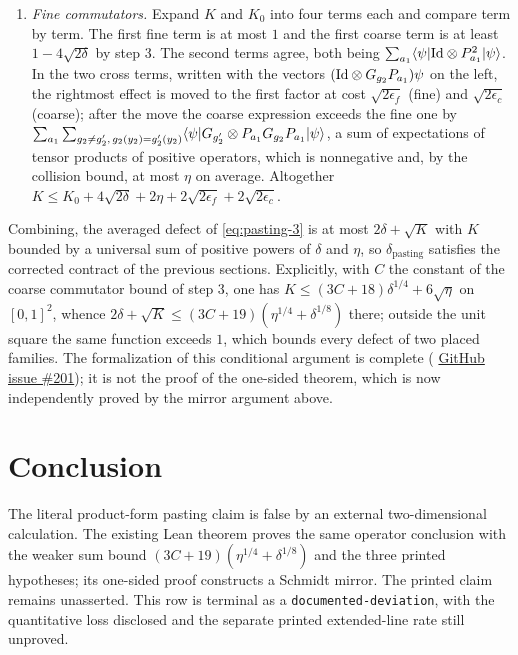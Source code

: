 \documentclass[11pt]{article}
\renewcommand{\ghissue}[1]{%
  \href{https://github.com/Dengnifer/MIPStarRE-QPBT/issues/#1}{GitHub issue \##1}}
\begin{document}
\begin{enumerate}
  $\epsilon_f=\sum_{g_2\neq g_2'}\langle\psi|G_{g_2}\ot G_{g_2'}|\psi\rangle
  \le\epsilon_c+\eta$.  Both families being projective,
  $\sum_{g_2}\|(G_{g_2}\ot\mathrm{Id}-\mathrm{Id}\ot G_{g_2})\psi\|^2
  =2\epsilon_f$, and likewise $2\epsilon_c$ for the coarse family.  This is
  the only step using \eqref{eq:pasting-1-sym}.
  \item \emph{Fine commutators.}  Expand $K$ and $K_0$ into four terms each
  and compare term by term.  The first fine term is at most $1$ and the first
  coarse term is at least $1-4\sqrt{2\delta}$ by step 3.  The second terms
  agree, both being $\sum_{a_1}\langle\psi|\mathrm{Id}\otimes P_{a_1}^2|\psi\rangle$.
  In the two cross terms, written with the vectors
  $(\mathrm{Id}\otimes G_{g_2}P_{a_1})\psi$ on the left, the rightmost effect is
  moved to the first factor at cost $\sqrt{2\epsilon_f}$ (fine) and
  $\sqrt{2\epsilon_c}$ (coarse); after the move the coarse expression exceeds
  the fine one by
  $\sum_{a_1}\sum_{g_2\neq g_2',\,g_2(y_2)=g_2'(y_2)}
  \langle\psi|G_{g_2'}\otimes P_{a_1}G_{g_2}P_{a_1}|\psi\rangle$, a sum of
  expectations of tensor products of positive operators, which is
  nonnegative and, by the collision bound, at most $\eta$ on average.
  Altogether
  $K\le K_0+4\sqrt{2\delta}+2\eta+2\sqrt{2\epsilon_f}+2\sqrt{2\epsilon_c}$.
\end{enumerate}
Combining, the averaged defect of \eqref{eq:pasting-3} is at most
$2\delta+\sqrt K$ with $K$ bounded by a universal sum of positive powers of
$\delta$ and $\eta$, so $\delta_{\mathrm{pasting}}$ satisfies the corrected
contract of the previous sections.  Explicitly, with $C$ the constant of the
coarse commutator bound of step 3, one has
$K\le(3C+18)\delta^{1/4}+6\sqrt\eta$ on $[0,1]^2$, whence
$2\delta+\sqrt K\le(3C+19)(\eta^{1/4}+\delta^{1/8})$ there; outside the unit
square the same function exceeds $1$, which bounds every defect of two placed
families.  The formalization of this conditional argument is complete (\ghissue{201});
it is not the proof of the one-sided theorem, which is now independently
proved by the mirror argument above.

\section{Conclusion}

The literal product-form pasting claim is false by an external
two-dimensional calculation. The existing Lean theorem proves the same
operator conclusion with the weaker sum bound
$(3C+19)(\eta^{1/4}+\delta^{1/8})$ and the three printed hypotheses; its
one-sided proof constructs a Schmidt mirror. The printed claim remains
unasserted. This row is terminal as a \texttt{documented-deviation}, with
the quantitative loss disclosed and the separate printed extended-line rate
still unproved.



\end{document}
